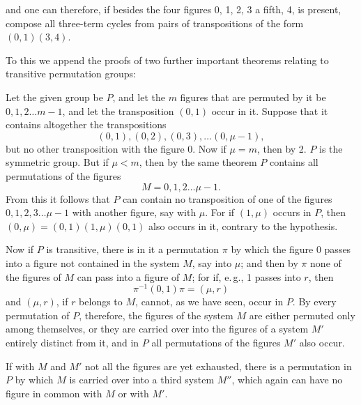 and one can therefore, if besides the four figures 0, 1, 2, 3 a fifth, 4, is present, compose all three-term cycles from pairs of transpositions of the form $(0, 1)(3, 4)$.

To this we append the proofs of two further important theorems relating to transitive permutation groups:


Let the given group be $P$, and let the $m$ figures that are permuted by it be $0, 1, 2 \dots m - 1$, and let the transposition $(0, 1)$ occur in it. Suppose that it contains altogether the transpositions
\[
(0, 1), (0, 2), (0, 3), \dots (0, \mu - 1),
\]
but no other transposition with the figure 0. Now if $\mu = m$, then by 2. $P$ is the symmetric group. But if $\mu < m$, then by the same theorem $P$ contains all permutations of the figures
\[
M = 0, 1, 2 \dots \mu - 1.
\]
From this it follows that $P$ can contain no transposition of one of the figures $0, 1, 2, 3 \dots \mu - 1$ with another figure, say with $\mu$. For if $(1, \mu)$ occurs in $P$, then $(0, \mu) = (0, 1)(1, \mu)(0, 1)$ also occurs in it, contrary to the hypothesis.

Now if $P$ is transitive, there is in it a permutation $\pi$ by which the figure 0 passes into a figure not contained in the system $M$, say into $\mu$; and then by $\pi$ none of the figures of $M$ can pass into a figure of $M$; for if, e.\,g., 1 passes into $r$, then
\[
\pi^{-1}(0, 1)\pi = (\mu, r)
\]
and $(\mu, r)$, if $r$ belongs to $M$, cannot, as we have seen, occur in $P$. By every permutation of $P$, therefore, the figures of the system $M$ are either permuted only among themselves, or they are carried over into the figures of a system $M'$ entirely distinct from it, and in $P$ all permutations of the figures $M'$ also occur.

If with $M$ and $M'$ not all the figures are yet exhausted, there is a permutation in $P$ by which $M$ is carried over into a third system $M''$, which again can have no figure in common with $M$ or with $M'$.
